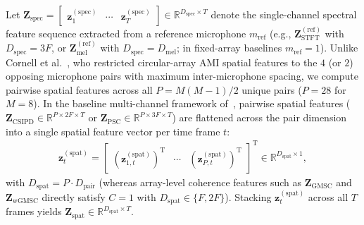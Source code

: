 \documentclass[lettersize,journal]{IEEEtran}
\begin{document}
Let $\mathbf{Z}_{\mathrm{spec}} = \begin{bmatrix} \mathbf{z}_1^{(\mathrm{spec})} & \cdots & \mathbf{z}_T^{(\mathrm{spec})} \end{bmatrix} \in \mathbb{R}^{D_{\mathrm{spec}} \times T}$ denote the single-channel spectral feature sequence extracted from a reference microphone $m_{\mathrm{ref}}$ (e.g., $\mathbf{Z}_{\mathrm{STFT}}^{(\mathrm{ref})}$ with $D_{\mathrm{spec}} = 3F$, or $\mathbf{Z}_{\mathrm{mel}}^{(\mathrm{ref})}$ with $D_{\mathrm{spec}} = D_{\mathrm{mel}}$; in fixed-array baselines $m_{\mathrm{ref}} = 1$). Unlike Cornell et al.~\cite{cornell2022overlapped}, who restricted circular-array \gls{AMI} spatial features to the $4$ (or $2$) opposing microphone pairs with maximum inter-microphone spacing, we compute pairwise spatial features across all $P = M(M-1)/2$ unique pairs ($P = 28$ for $M = 8$). In the baseline multi-channel framework of~\cite{cornell2022overlapped}, pairwise spatial features ($\mathbf{Z}_{\mathrm{CSIPD}} \in \mathbb{R}^{P \times 2F \times T}$ or $\mathbf{Z}_{\mathrm{PSC}} \in \mathbb{R}^{P \times 3F \times T}$) are flattened across the pair dimension into a single spatial feature vector per time frame $t$:
\begin{align}
  \mathbf{z}_t^{(\mathrm{spat})} = \begin{bmatrix} \left(\mathbf{z}_{1,t}^{(\mathrm{spat})}\right)^{\mathrm{T}} & \cdots & \left(\mathbf{z}_{P,t}^{(\mathrm{spat})}\right)^{\mathrm{T}} \end{bmatrix}^{\mathrm{T}} \in \mathbb{R}^{D_{\mathrm{spat}} \times 1},
  \label{eq:flattened_spatial_vec}
\end{align}
with $D_{\mathrm{spat}} = P \cdot D_{\mathrm{pair}}$ (whereas array-level coherence features such as $\mathbf{Z}_{\mathrm{GMSC}}$ and $\mathbf{Z}_{\mathrm{wGMSC}}$ directly satisfy $C=1$ with $D_{\mathrm{spat}} \in \{F, 2F\}$). Stacking $\mathbf{z}_t^{(\mathrm{spat})}$ across all $T$ frames yields $\mathbf{Z}_{\mathrm{spat}} \in \mathbb{R}^{D_{\mathrm{spat}} \times T}$.
\end{document}
